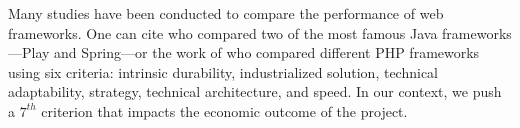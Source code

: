 
Many studies have been conducted to compare the performance of web frameworks.
One can cite \cite{gajewski_analysis_2019} who compared two of the most famous Java frameworks---Play and Spring---or the work of \cite{benmoussa_new_2019} who compared different PHP frameworks using six criteria: intrinsic durability, industrialized solution, technical adaptability, strategy, technical architecture, and speed.
In our context, we push a $7^{th}$ criterion that impacts the economic outcome of the project.






